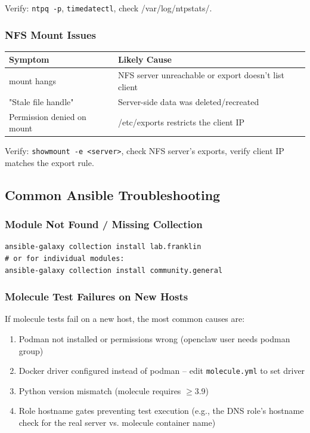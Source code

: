 Verify: \texttt{ntpq -p}, \texttt{timedatectl}, check /var/log/ntpstats/.

\subsubsection{NFS Mount Issues}

\begin{tabularx}{\textwidth}{l X}
\textbf{Symptom} & \textbf{Likely Cause} \\
\hline
mount hangs & NFS server unreachable or export doesn't list client\\
"Stale file handle" & Server-side data was deleted/recreated\\
Permission denied on mount & /etc/exports restricts the client IP
\end{tabularx}

Verify: \texttt{showmount -e <server>}, check NFS server's exports, verify client IP matches the export rule.

\subsection{Common Ansible Troubleshooting}

\subsubsection{Module Not Found / Missing Collection}

\begin{lstlisting}[style=mystyle]
ansible-galaxy collection install lab.franklin
# or for individual modules:
ansible-galaxy collection install community.general
    \end{lstlisting}

\subsubsection{Molecule Test Failures on New Hosts}

If molecule tests fail on a new host, the most common causes are:
\begin{enumerate}
    \item Podman not installed or permissions wrong (openclaw user needs podman group)
    
    \item Docker driver configured instead of podman -- edit \texttt{molecule.yml} to set driver
    
    \item Python version mismatch (molecule requires $\ge$3.9)
    
    \item Role hostname gates preventing test execution (e.g., the DNS role's hostname check for the real server vs. molecule container name)
\end{enumerate}

